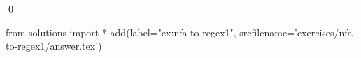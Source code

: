 
\begin{ex} 
  \label{ex:nfa-to-regex1}
  
  \qed
\end{ex} 
\begin{python0}
from solutions import *
add(label="ex:nfa-to-regex1",
    srcfilename='exercises/nfa-to-regex1/answer.tex') 
\end{python0}

